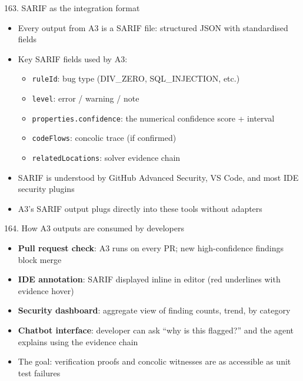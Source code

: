 \documentclass[aspectratio=169]{beamer}
\begin{document}
\begin{frame}{163. SARIF as the integration format}
\begin{itemize}
  \item Every output from A3 is a SARIF file: structured JSON with standardised fields
  \item Key SARIF fields used by A3:
    \begin{itemize}
      \item \texttt{ruleId}: bug type (DIV\_ZERO, SQL\_INJECTION, etc.)
      \item \texttt{level}: error / warning / note
      \item \texttt{properties.confidence}: the numerical confidence score + interval
      \item \texttt{codeFlows}: concolic trace (if confirmed)
      \item \texttt{relatedLocations}: solver evidence chain
    \end{itemize}
  \item SARIF is understood by GitHub Advanced Security, VS Code, and most IDE security plugins
  \item A3's SARIF output plugs directly into these tools without adapters
\end{itemize}
\end{frame}

\begin{frame}{164. How A3 outputs are consumed by developers}
\begin{itemize}
  \item \textbf{Pull request check}: A3 runs on every PR; new high-confidence findings block merge
  \item \textbf{IDE annotation}: SARIF displayed inline in editor (red underlines with evidence hover)
  \item \textbf{Security dashboard}: aggregate view of finding counts, trend, by category
  \item \textbf{Chatbot interface}: developer can ask ``why is this flagged?'' and the agent explains using the evidence chain
  \item The goal: verification proofs and concolic witnesses are as accessible as unit test failures
\end{itemize}
\end{frame}
\end{document}
